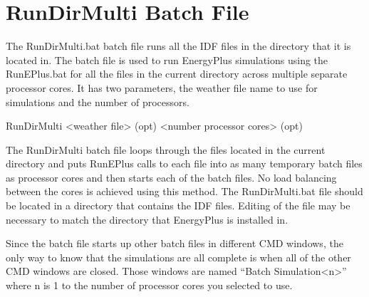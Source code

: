 \section{RunDirMulti Batch File}\label{rundirmulti-batch-file}

The RunDirMulti.bat batch file runs all the IDF files in the directory that it is located in. The batch file is used to run EnergyPlus simulations using the RunEPlus.bat for all the files in the current directory across multiple separate processor cores. It has two parameters, the weather file name to use for simulations and the number of processors.

RunDirMulti \textless{}weather file\textgreater{} (opt) \textless{}number processor cores\textgreater{} (opt)

The RunDirMulti batch file loops through the files located in the current directory and puts RunEPlus calls to each file into as many temporary batch files as processor cores and then starts each of the batch files. No load balancing between the cores is achieved using this method. The RunDirMulti.bat file should be located in a directory that contains the IDF files. Editing of the file may be necessary to match the directory that EnergyPlus is installed in.

Since the batch file starts up other batch files in different CMD windows, the only way to know that the simulations are all complete is when all of the other CMD windows are closed. Those windows are named ``Batch Simulation\textless{}n\textgreater{}'' where n is 1 to the number of processor cores you selected to use.
